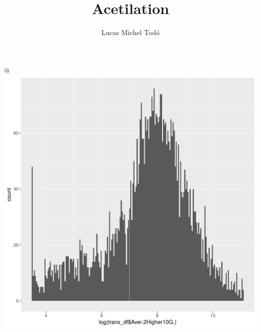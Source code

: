\documentclass{article}\usepackage[]{graphicx}\usepackage[]{color}
\makeatletter
\def\maxwidth{ %
  \ifdim\Gin@nat@width>\linewidth
    \linewidth
  \else
    \Gin@nat@width
  \fi
}
\newenvironment{knitrout}{}{} %
\makeatother
\begin{document}
\title{Acetilation}
\author{Lucas Michel Todó}
\maketitle
\tableofcontents
\clearpage







@
\begin{knitrout}
\color{fgcolor}
\includegraphics[width=\maxwidth]{figure/import_status_data-1} 


\end{knitrout}
\end{document}
